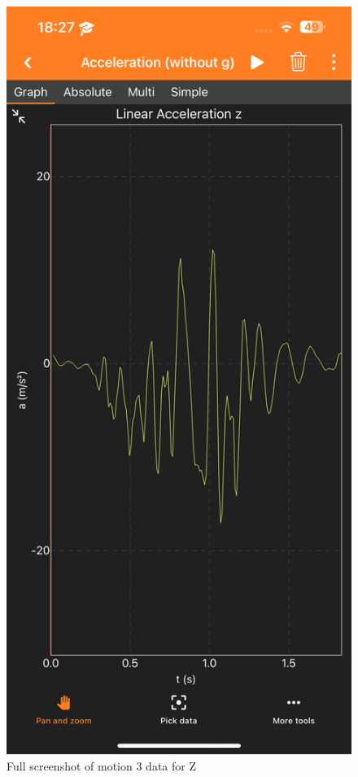 \documentclass[idxtotoc,hyperref,openany]{labbook} %
\begin{document}
\begin{figure}[H] %
\begin{center}
\includegraphics[width=.55\linewidth]{images/Lab.03/Lab03Motion3Z.PNG}
\end{center}
\caption{Full screenshot of motion 3 data for Z}
\label{fig:Lab03-Motion3-Z}
\end{figure}
\end{document}
